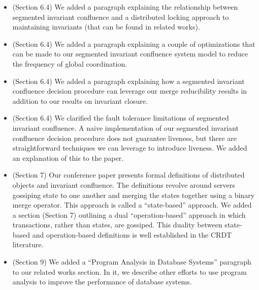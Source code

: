 \documentclass[12pt]{article}
\begin{document}
\begin{itemize}
  \item (Section 6.4)
    We added a paragraph explaining the relationship between segmented
    invariant confluence and a distributed locking approach to maintaining
    invariants (that can be found in related works).

  \item (Section 6.4)
    We added a paragraph explaining a couple of optimizations that can be made
    to our segmented invariant confluence system model to reduce the frequency
    of global coordination.

  \item (Section 6.4)
    We added a paragraph explaining how a segmented invariant confluence
    decision procedure can leverage our merge reducibility results in addition
    to our results on invariant closure.

  \item (Section 6.4)
    We clarified the fault tolerance limitations of segmented invariant
    confluence. A naive implementation of our segmented invariant confluence
    decision procedure does not guarantee liveness, but there are
    straightforward techniques we can leverage to introduce liveness. We added
    an explanation of this to the paper.

  \item (Section 7)
    Our conference paper presents formal definitions of distributed objects and
    invariant confluence. The definitions revolve around servers gossiping
    state to one another and merging the states together using a binary merge
    operator. This approach is called a ``state-based'' approach. We added a
    section (Section 7) outlining a dual ``operation-based'' approach in which
    transactions, rather than states, are gossiped. This duality between
    state-based and operation-based definitions is well established in the CRDT
    literature.

  \item (Section 9)
    We added a ``Program Analysis in Database Systems'' paragraph to our
    related works section. In it, we describe other efforts to use program
    analysis to improve the performance of database systems.
\end{itemize}



\end{document}
